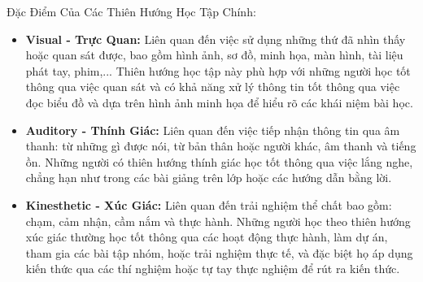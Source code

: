Đặc Điểm Của Các Thiên Hướng Học Tập Chính:
\begin{itemize}
    \item \textbf{Visual - Trực Quan:} Liên quan đến việc sử dụng những thứ đã nhìn thấy hoặc quan sát được, bao gồm hình ảnh, sơ đồ, minh họa, màn hình, tài liệu phát tay, phim,... Thiên hướng học tập này phù hợp với những người học tốt thông qua việc quan sát và có khả năng xử lý thông tin tốt thông qua việc đọc biểu đồ và dựa trên hình ảnh minh họa để hiểu rõ các khái niệm bài học.
    \item \textbf{Auditory - Thính Giác:} Liên quan đến việc tiếp nhận thông tin qua âm thanh: từ những gì được nói, từ bản thân hoặc người khác, âm thanh và tiếng ồn. Những người có thiên hướng thính giác học tốt thông qua việc lắng nghe, chẳng hạn như trong các bài giảng trên lớp hoặc các hướng dẫn bằng lời.
    \item \textbf{Kinesthetic - Xúc Giác:} Liên quan đến trải nghiệm thể chất bao gồm: chạm, cảm nhận, cầm nắm và thực hành. Những người học theo thiên hướng xúc giác thường học tốt thông qua các hoạt động thực hành, làm dự án, tham gia các bài tập nhóm, hoặc trải nghiệm thực tế, và đặc biệt họ áp dụng kiến thức qua các thí nghiệm hoặc tự tay thực nghiệm để rút ra kiến thức.
\end{itemize}


